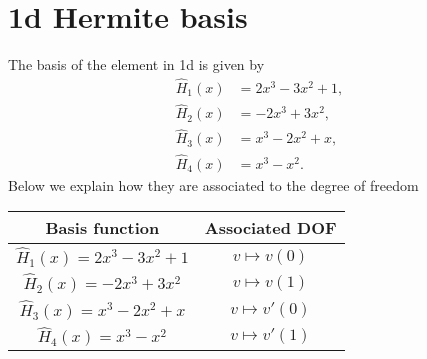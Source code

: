 \documentclass[]{report}
\begin{document}
    \section*{1d Hermite basis}
    The basis of the element in 1d is given by
    \begin{align*}
        \hat H_1(x) &= 2x^3-3x^2+1, \\
        \hat H_2(x) &= -2x^3+3x^2, \\
        \hat H_3(x) &= x^3-2x^2+x, \\
        \hat H_4(x) &= x^3 - x^2.
    \end{align*}
    Below we explain how they are associated to the degree of freedom
    \begin{center}
        \begin{tabular}[]{|c|c|}
            \hline
            Basis function & Associated DOF \\
            \hline \hline
            $\hat{H}_1(x) = 2x^3-3x^2+1$ & $v \mapsto v(0)$ \\
            \hline
            $\hat{H}_2(x) = -2x^3+3x^2$ & $v \mapsto v(1)$ \\
            \hline
            $\hat{H}_3(x) = x^3-2x^2+x$ & $v \mapsto v'(0)$ \\ 
            \hline
            $\hat{H}_4(x) = x^3 - x^2$ & $v \mapsto v'(1)$ \\
            \hline
        \end{tabular}
    \end{center}
    \begin{center}
    \end{center}
\end{document}
